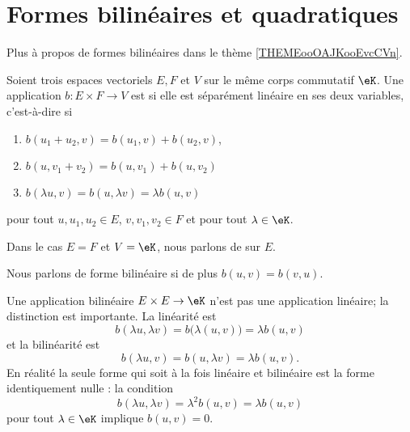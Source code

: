 

\section{Formes bilinéaires et quadratiques}

Plus à propos de formes bilinéaires dans le thème \ref{THEMEooOAJKooEvcCVn}.

\begin{definition}      \label{DEFooEEQGooNiPjHz}
	Soient trois espaces vectoriels \( E,F\) et \( V\) sur le même corps commutatif \( \eK\). Une application \( b\colon E\times F\to V\) est  si elle est séparément linéaire en ses deux variables, c'est-à-dire si
	\begin{enumerate}
		\item
		      \( b(u_1+u_2,v)=b(u_1,v)+b(u_2,v)\),
		\item
		      \( b(u,v_1+v_2)=b(u,v_1)+b(u,v_2)\)
		\item
		      \( b(\lambda u,v)=b(u,\lambda v)=\lambda b(u,v)\)
	\end{enumerate}
	pour tout \( u,u_1,u_2\in E\), \( v,v_1,v_2\in F\) et pour tout \( \lambda\in \eK\).

	Dans le cas \( E=F\) et \( V=\eK\), nous parlons de  sur \( E\).

	Nous parlons de forme bilinéaire  si de plus \( b(u,v)=b(v,u)\).
\end{definition}

\begin{normaltext}
	Une application bilinéaire \( E\times E\to \eK\) n'est pas une application linéaire; la distinction est importante. La linéarité est
	\begin{equation}
		b(\lambda u,\lambda v)= b\big( \lambda(u,v) \big)=\lambda b(u,v)
	\end{equation}
	et la bilinéarité est
	\begin{equation}
		b(\lambda u,v)=b(u,\lambda v)=\lambda b(u,v).
	\end{equation}
	En réalité la seule forme qui soit à la fois linéaire et bilinéaire est la forme identiquement nulle : la condition
	\begin{equation}
		b(\lambda u,\lambda v)=\lambda^2b(u,v)=\lambda b(u,v)
	\end{equation}
	pour tout \( \lambda\in \eK\) implique \( b(u,v)=0\).
\end{normaltext}


